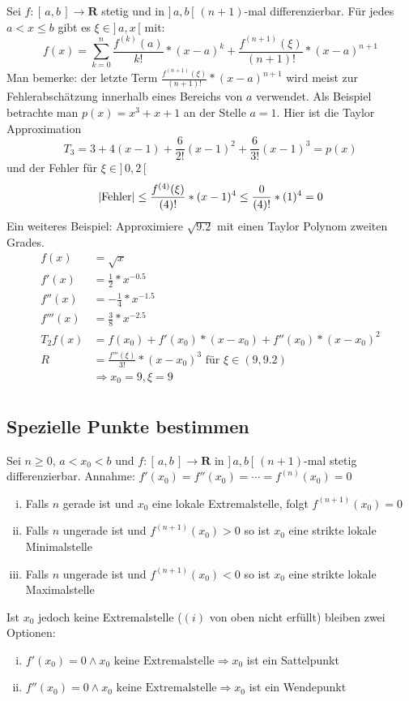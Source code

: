 \documentclass[8pt]{extarticle}
\begin{document}
\begin{multicols*}{3}
Sei $f: [\, a, b\,] \rightarrow \mathbf{R}$ stetig und in $]\, a, b\,[$
$(n+1)$-mal differenzierbar. Für jedes $a < x \leq b$ gibt es $\xi \in ]\,a, x\,[$ mit:
$$
f(x) = \sum_{k = 0}^n \frac{f^{(k)}(a)}{k!} * (x - a)^k + \frac{f^{(n + 1)}(\xi)}{(n + 1)!} * (x - a)^{n + 1}
$$
Man bemerke: der letzte Term $\frac{f^{(n + 1)}(\xi)}{(n + 1)!} * (x - a)^{n + 1}$ wird meist zur Fehlerabschätzung innerhalb eines Bereichs von $a$ verwendet.
Als Beispiel betrachte man $p(x) = x^3 + x + 1$ an der Stelle $a = 1$. Hier ist
die Taylor Approximation $$T_3 = 3 + 4(x - 1) + \frac{6}{2!}(x-1)^2 + \frac{6}{3!}(x-1)^3 = p(x)$$
und der Fehler für $\xi \in ]\,0, 2\,[$
$$
  |\text{Fehler}| \leq \frac{f^{(4)}(\xi)}{(4)!} * (x - 1)^{4} \leq \frac{0}{(4)!} * (1)^{4} = 0\\
$$
Ein weiteres Beispiel: Approximiere $\sqrt{9.2}$ mit einen Taylor Polynom
zweiten Grades.
\begin{align*}
  f(x) &= \sqrt{x}\\
  f'(x) &= \frac{1}{2} * x^{-0.5}\\
  f''(x) &= - \frac{1}{4} * x^{-1.5}\\
  f'''(x) &= \frac{3}{8} * x^{-2.5}\\
  T_2 f(x) &= f(x_0) + f'(x_0) * (x - x_0) + f''(x_0) * (x - x_0)^2\\
  R &= \frac{f'''(\xi)}{3!} * (x - x_0)^3 \text{ für $\xi \in (9, 9.2)$}\\
  &\Rightarrow x_0 = 9, \xi = 9\\
\end{align*}


\subsection{Spezielle Punkte bestimmen}

Sei $n \geq 0$, $a < x_0 < b$ und $f: [\,a, b\,] \rightarrow \mathbf{R}$ in $]\,a, b\,[$ $(n+1)$-mal stetig differenzierbar.
Annahme: $f'(x_0) = f''(x_0) = \cdots = f^{(n)}(x_0) = 0$
\begin{enumerate}[(i)]
  \item Falls $n$ gerade ist und $x_0$ eine lokale Extremalstelle, folgt $f^{(n+1)}(x_0) = 0$
  \item Falls $n$ ungerade ist und $f^{(n+1)}(x_0) > 0$ so ist $x_0$ eine strikte lokale Minimalstelle
  \item Falls $n$ ungerade ist und $f^{(n+1)}(x_0) < 0$ so ist $x_0$ eine strikte lokale Maximalstelle
\end{enumerate}
Ist $x_0$ jedoch keine Extremalstelle ($(i)$ von oben nicht erfüllt) bleiben zwei Optionen:
\begin{enumerate}[(i)]
  \item $f'(x_0) = 0 \land x_0 \text{ keine Extremalstelle} \Rightarrow x_0$ ist ein Sattelpunkt
  \item $f''(x_0) = 0 \land x_0 \text{ keine Extremalstelle} \Rightarrow x_0$ ist ein Wendepunkt
\end{enumerate}


\end{multicols*}
\end{document}
